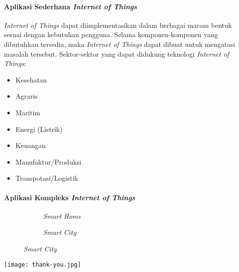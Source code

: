 \begin{frame}[fragile=singleslide]{\insertsectionhead}
  \framesubtitle{Aplikasi Sederhana \textit{Internet of Things}}
  \justifying
  \textit{Internet of Things} dapat diimplementasikan dalam berbagai macam bentuk sesuai dengan kebutuhan pengguna. Selama komponen-komponen yang dibutuhkan tersedia, maka \textit{Internet of Things} dapat dibuat untuk mengatasi masalah tersebut.
  \vfill
  Sektor-sektor yang dapat didukung teknologi \textit{Internet of Things}:
  \begin{multicols}{2}
  \begin{itemize}
  	\item Kesehatan
  	\item Agraris
  	\item Maritim
  	\item Energi (Listrik)
  	\item Keuangan
  	\item Manufaktur/Produksi
  	\item Transpotasi/Logistik
  \end{itemize}
\end{multicols}
\end{frame}

\begin{frame}[fragile=singleslide]{\insertsectionhead}
	\framesubtitle{Aplikasi Kompleks \textit{Internet of Things}}
	\justifying
	\centering
	  \begin{figure}[ht!]
		\begin{subfigure}[b]{0.48\textwidth}
				\caption*{\textit{Smart Home}}
			\end{subfigure}
		\hspace{\fill}
		\begin{subfigure}[b]{0.48\textwidth}
				\caption*{\textit{Smart City}}
			\end{subfigure}
	\end{figure}
\end{frame}

{
	\texttt{[image: thank-you.jpg]}
}
\begin{frame}[plain]
\end{frame}